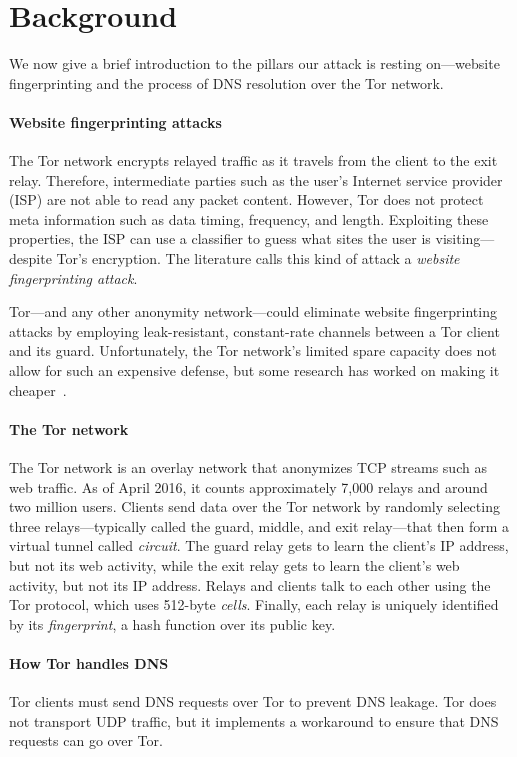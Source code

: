 \section{Background}
\label{sec:background}
We now give a brief introduction to the pillars our attack is resting
on---website fingerprinting and the process of DNS resolution over the Tor
network.

\paragraph{Website fingerprinting attacks}
The Tor network encrypts relayed traffic as it travels from the client to the
exit relay.  Therefore, intermediate parties such as the user's Internet service
provider (ISP) are not able to read any packet content.  However, Tor does not
protect meta information such as data timing, frequency, and length.  Exploiting
these properties, the ISP can use a classifier to guess what sites the user is
visiting---despite Tor's encryption.  The literature calls this kind of attack a
\emph{website fingerprinting attack}.

Tor---and any other anonymity network---could eliminate website fingerprinting
attacks by employing leak-resistant, constant-rate channels between a Tor client
and its guard.  Unfortunately, the Tor network's limited spare capacity does not
allow for such an expensive defense, but some research has worked on making it
cheaper~\cite{Cai2014a,DBLP:journals/corr/JuarezIPDW15,WangThesis}. %

\paragraph{The Tor network}
The Tor network is an overlay network that anonymizes TCP streams such as web
traffic.  As of April 2016, it counts approximately 7,000 relays and around two
million users.  Clients send data over the Tor network by randomly selecting
three relays---typically called the guard, middle, and exit relay---that then
form a virtual tunnel called \emph{circuit}.  The guard relay gets to learn the
client's IP address, but not its web activity, while the exit relay gets to
learn the client's web activity, but not its IP address.  Relays and clients
talk to each other using the Tor protocol, which uses 512-byte \emph{cells}.
Finally, each relay is uniquely identified by its \emph{fingerprint}, a hash
function over its public key.

\paragraph{How Tor handles DNS}
Tor clients must send DNS requests over Tor to prevent DNS leakage.  Tor
does not transport UDP traffic, but it implements a workaround to ensure that
DNS requests can go over Tor.

